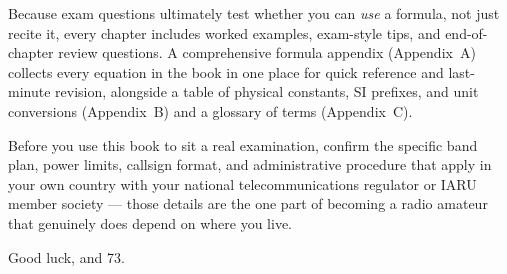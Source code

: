 Because exam questions ultimately test whether you can \emph{use} a
formula, not just recite it, every chapter includes worked examples,
exam-style tips, and end-of-chapter review questions. A comprehensive
formula appendix (Appendix~A) collects every equation in the book in one
place for quick reference and last-minute revision, alongside a table of
physical constants, SI prefixes, and unit conversions (Appendix~B) and a
glossary of terms (Appendix~C).

Before you use this book to sit a real examination, confirm the specific
band plan, power limits, callsign format, and administrative procedure
that apply in your own country with your national telecommunications
regulator or IARU member society --- those details are the one part of
becoming a radio amateur that genuinely does depend on where you live.

Good luck, and 73.
